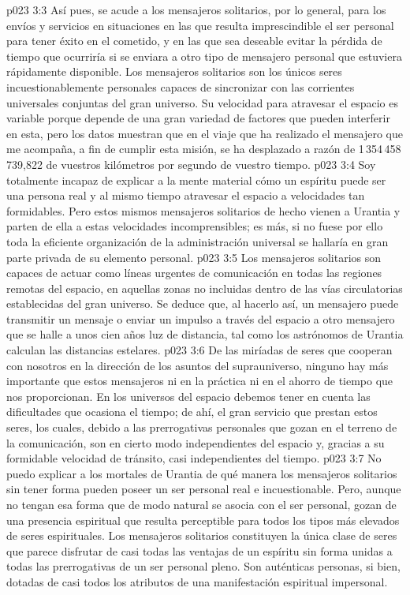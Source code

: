\vs p023 3:3 Así pues, se acude a los mensajeros solitarios, por lo general, para los envíos y servicios en situaciones en las que resulta imprescindible el ser personal para tener éxito en el cometido, y en las que sea deseable evitar la pérdida de tiempo que ocurriría si se enviara a otro tipo de mensajero personal que estuviera rápidamente disponible. Los mensajeros solitarios son los únicos seres incuestionablemente personales capaces de sincronizar con las corrientes universales conjuntas del gran universo. Su velocidad para atravesar el espacio es variable porque depende de una gran variedad de factores que pueden interferir en esta, pero los datos muestran que en el viaje que ha realizado el mensajero que me acompaña, a fin de cumplir esta misión, se ha desplazado a razón de 1\,354\,458\,739,822 de vuestros kilómetros por segundo de vuestro tiempo.
\vs p023 3:4 Soy totalmente incapaz de explicar a la mente material cómo un espíritu puede ser una persona real y al mismo tiempo atravesar el espacio a velocidades tan formidables. Pero estos mismos mensajeros solitarios de hecho vienen a Urantia y parten de ella a estas velocidades incomprensibles; es más, si no fuese por ello toda la eficiente organización de la administración universal se hallaría en gran parte privada de su elemento personal.
\vs p023 3:5 \pc Los mensajeros solitarios son capaces de actuar como líneas urgentes de comunicación en todas las regiones remotas del espacio, en aquellas zonas no incluidas dentro de las vías circulatorias establecidas del gran universo. Se deduce que, al hacerlo así, un mensajero puede transmitir un mensaje o enviar un impulso a través del espacio a otro mensajero que se halle a unos cien años luz de distancia, tal como los astrónomos de Urantia calculan las distancias estelares.
\vs p023 3:6 De las miríadas de seres que cooperan con nosotros en la dirección de los asuntos del suprauniverso, ninguno hay más importante que estos mensajeros ni en la práctica ni en el ahorro de tiempo que nos proporcionan. En los universos del espacio debemos tener en cuenta las dificultades que ocasiona el tiempo; de ahí, el gran servicio que prestan estos seres, los cuales, debido a las prerrogativas personales que gozan en el terreno de la comunicación, son en cierto modo independientes del espacio y, gracias a su formidable velocidad de tránsito, casi independientes del tiempo.
\vs p023 3:7 \pc No puedo explicar a los mortales de Urantia de qué manera los mensajeros solitarios sin tener forma pueden poseer un ser personal real e incuestionable. Pero, aunque no tengan esa forma que de modo natural se asocia con el ser personal, gozan de una presencia espiritual que resulta perceptible para todos los tipos más elevados de seres espirituales. Los mensajeros solitarios constituyen la única clase de seres que parece disfrutar de casi todas las ventajas de un espíritu sin forma unidas a todas las prerrogativas de un ser personal pleno. Son auténticas personas, si bien, dotadas de casi todos los atributos de una manifestación espiritual impersonal.
